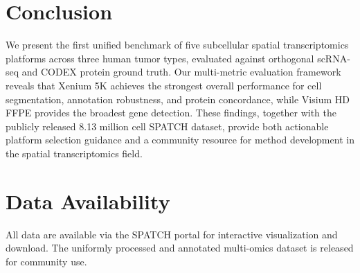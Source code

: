 \documentclass[11pt]{article}
\begin{document}
\section{Conclusion}

We present the first unified benchmark of five subcellular spatial transcriptomics platforms across three human tumor types, evaluated against orthogonal scRNA-seq and CODEX protein ground truth. Our multi-metric evaluation framework reveals that Xenium 5K achieves the strongest overall performance for cell segmentation, annotation robustness, and protein concordance, while Visium HD FFPE provides the broadest gene detection. These findings, together with the publicly released 8.13 million cell SPATCH dataset, provide both actionable platform selection guidance and a community resource for method development in the spatial transcriptomics field.

\section*{Data Availability}
All data are available via the SPATCH portal for interactive visualization and download. The uniformly processed and annotated multi-omics dataset is released for community use.



\end{document}
